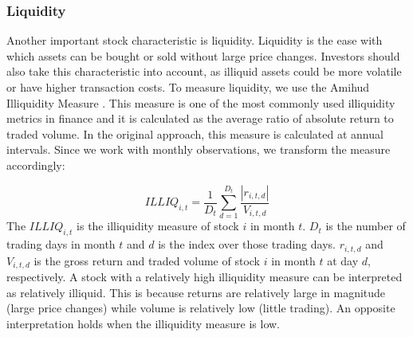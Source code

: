 \documentclass[11pt]{article}
\begin{document}
\subsubsection{Liquidity}
Another important stock characteristic is liquidity.
Liquidity is the ease with which assets can be bought or sold without large price changes. Investors should also take this characteristic into account, as illiquid assets could be more volatile or have higher transaction costs. To measure liquidity, we use the Amihud Illiquidity Measure \citep{amihud2002illiquidity}. This measure is one of the most commonly used illiquidity metrics in finance and it is calculated as the average ratio of absolute return to traded volume. In the original approach, this measure is calculated at annual intervals. Since we work with monthly observations, we transform the measure accordingly:

\begin{equation}
    ILLIQ_{i,t} = \frac{1}{D_t}\sum^{D_t}_{d=1} \frac{|r_{i,t,d}|}{V_{i,t,d}}
\end{equation}
The $ILLIQ_{i,t}$ is the illiquidity measure of stock $i$ in month $t$. $D_t$ is the number of trading days in month $t$ and $d$ is the index over those trading days. $r_{i,t,d}$ and $V_{i,t,d}$ is the gross return and traded volume of stock $i$ in month $t$ at day $d$, respectively. A stock with a relatively high illiquidity measure can be interpreted as relatively illiquid. This is because returns are relatively large in magnitude (large price changes) while volume is relatively low (little trading). An opposite interpretation holds when the illiquidity measure is low.
\end{document}
